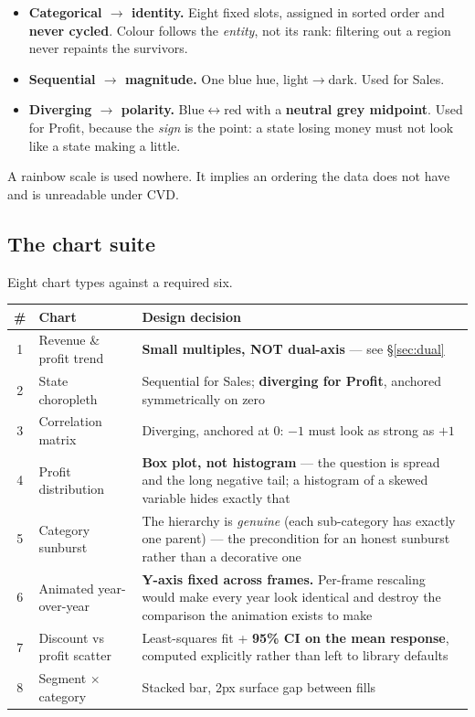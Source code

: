 \documentclass[11pt,a4paper]{article}
\begin{document}
\begin{itemize}[leftmargin=*]
\item \textbf{Categorical $\rightarrow$ identity.} Eight fixed slots, assigned in sorted
      order and \textbf{never cycled}. Colour follows the \emph{entity}, not its rank:
      filtering out a region never repaints the survivors.
\item \textbf{Sequential $\rightarrow$ magnitude.} One blue hue, light$\rightarrow$dark.
      Used for Sales.
\item \textbf{Diverging $\rightarrow$ polarity.} Blue$\leftrightarrow$red with a
      \textbf{neutral grey midpoint}. Used for Profit, because the \emph{sign} is the
      point: a state losing money must not look like a state making a little.
\end{itemize}

A rainbow scale is used nowhere. It implies an ordering the data does not have and is
unreadable under CVD.

\subsection{The chart suite}

Eight chart types against a required six.

\begin{center}
\begin{tabularx}{\textwidth}{@{}clX@{}}
\toprule
\textbf{\#} & \textbf{Chart} & \textbf{Design decision} \\
\midrule
1 & Revenue \& profit trend      & \textbf{Small multiples, NOT dual-axis} --- see \S\ref{sec:dual} \\
2 & State choropleth             & Sequential for Sales; \textbf{diverging for Profit}, anchored symmetrically on zero \\
3 & Correlation matrix           & Diverging, anchored at 0: $-1$ must look as strong as $+1$ \\
4 & Profit distribution          & \textbf{Box plot, not histogram} --- the question is spread and the long negative tail; a histogram of a skewed variable hides exactly that \\
5 & Category sunburst            & The hierarchy is \emph{genuine} (each sub-category has exactly one parent) --- the precondition for an honest sunburst rather than a decorative one \\
6 & Animated year-over-year      & \textbf{Y-axis fixed across frames.} Per-frame rescaling would make every year look identical and destroy the comparison the animation exists to make \\
7 & Discount vs profit scatter   & Least-squares fit + \textbf{95\% CI on the mean response}, computed explicitly rather than left to library defaults \\
8 & Segment $\times$ category    & Stacked bar, 2px surface gap between fills \\
\bottomrule
\end{tabularx}
\end{center}
\end{document}
